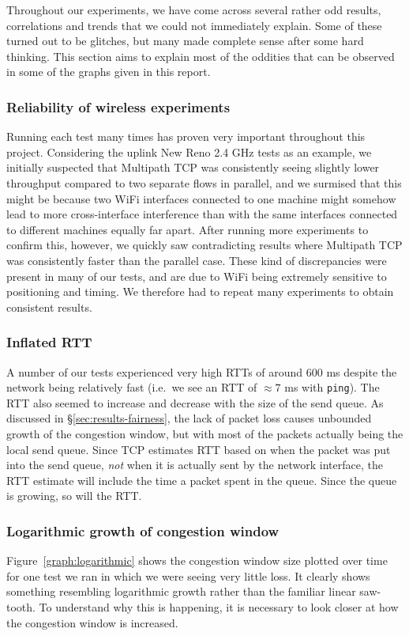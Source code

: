 Throughout our experiments, we have come across several rather odd results,
correlations and trends that we could not immediately explain. Some of these
turned out to be glitches, but many made complete sense after some hard
thinking. This section aims to explain most of the oddities that can be observed
in some of the graphs given in this report.

\subsubsection{Reliability of wireless experiments}
Running each test many times has proven very important throughout this project.
Considering the uplink New Reno 2.4 GHz tests as an example, we initially 
suspected that Multipath TCP was consistently seeing slightly lower 
throughput compared to two separate flows in parallel, and we surmised that
this might be because two 
WiFi interfaces connected to one machine might somehow lead to more 
cross-interface interference than with the same interfaces connected to 
different machines equally far apart. After running more experiments to confirm this, 
however, we quickly saw contradicting results where Multipath TCP was 
consistently faster than the parallel case. These kind of discrepancies were
present in many of our tests, and are due to WiFi being extremely sensitive to
positioning and timing. We therefore had to repeat many experiments to obtain
consistent results. 

\subsubsection{Inflated RTT}
A number of our tests experienced very high RTTs of around 600 ms despite the network
being relatively fast (i.e.\ we see an RTT of $\approx 7$ ms with \texttt{ping}).
The RTT also seemed to increase and decrease with the size of the send queue. As 
discussed in \S\ref{sec:results-fairness}, the lack of packet loss causes 
unbounded growth of the congestion window, but with most of the packets actually being
the local send queue. Since TCP estimates RTT based on when the packet was put into 
the send queue, \emph{not} when it is actually sent by the network interface, 
the RTT estimate will include the time a packet spent in the queue. Since the 
queue is growing, so will the RTT.

\subsubsection{Logarithmic growth of congestion window}
Figure~\ref{graph:logarithmic} shows the congestion window size plotted over
time for one test we ran in which we were seeing very little loss. It clearly
shows something resembling logarithmic growth rather than the familiar linear
saw-tooth. To understand why this is happening, it is necessary to look closer
at how the congestion window is increased.

